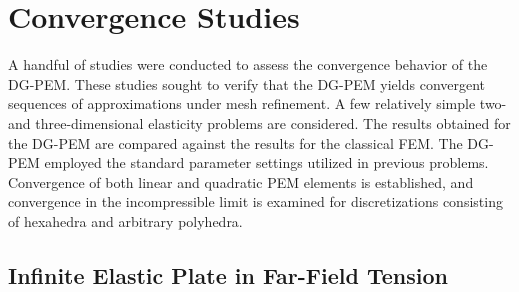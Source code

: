 

\section{Convergence Studies}

A handful of studies were conducted to assess the convergence behavior of the DG-PEM. These studies sought to verify that the DG-PEM yields convergent sequences of approximations under mesh refinement. A few relatively simple two- and three-dimensional elasticity problems are considered. The results obtained for the DG-PEM are compared against the results for the classical FEM. The DG-PEM employed the standard parameter settings utilized in previous problems. Convergence of both linear and quadratic PEM elements is established, and convergence in the incompressible limit is examined for discretizations consisting of hexahedra and arbitrary polyhedra.

\subsection*{Infinite Elastic Plate in Far-Field Tension}

